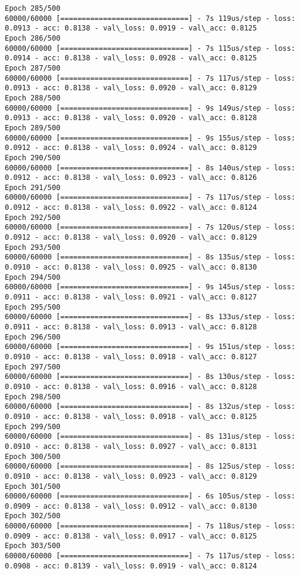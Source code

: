 \documentclass[11pt]{article}
\begin{document}
\begin{Verbatim}[commandchars=\\\{\}]
Epoch 285/500
60000/60000 [==============================] - 7s 119us/step - loss: 0.0913 - acc: 0.8138 - val\_loss: 0.0919 - val\_acc: 0.8125
Epoch 286/500
60000/60000 [==============================] - 7s 115us/step - loss: 0.0914 - acc: 0.8138 - val\_loss: 0.0928 - val\_acc: 0.8125
Epoch 287/500
60000/60000 [==============================] - 7s 117us/step - loss: 0.0913 - acc: 0.8138 - val\_loss: 0.0920 - val\_acc: 0.8129
Epoch 288/500
60000/60000 [==============================] - 9s 149us/step - loss: 0.0913 - acc: 0.8138 - val\_loss: 0.0920 - val\_acc: 0.8128
Epoch 289/500
60000/60000 [==============================] - 9s 155us/step - loss: 0.0912 - acc: 0.8138 - val\_loss: 0.0924 - val\_acc: 0.8129
Epoch 290/500
60000/60000 [==============================] - 8s 140us/step - loss: 0.0912 - acc: 0.8138 - val\_loss: 0.0923 - val\_acc: 0.8126
Epoch 291/500
60000/60000 [==============================] - 7s 117us/step - loss: 0.0912 - acc: 0.8138 - val\_loss: 0.0922 - val\_acc: 0.8124
Epoch 292/500
60000/60000 [==============================] - 7s 120us/step - loss: 0.0912 - acc: 0.8138 - val\_loss: 0.0920 - val\_acc: 0.8129
Epoch 293/500
60000/60000 [==============================] - 8s 135us/step - loss: 0.0910 - acc: 0.8138 - val\_loss: 0.0925 - val\_acc: 0.8130
Epoch 294/500
60000/60000 [==============================] - 9s 145us/step - loss: 0.0911 - acc: 0.8138 - val\_loss: 0.0921 - val\_acc: 0.8127
Epoch 295/500
60000/60000 [==============================] - 8s 133us/step - loss: 0.0911 - acc: 0.8138 - val\_loss: 0.0913 - val\_acc: 0.8128
Epoch 296/500
60000/60000 [==============================] - 9s 151us/step - loss: 0.0910 - acc: 0.8138 - val\_loss: 0.0918 - val\_acc: 0.8127
Epoch 297/500
60000/60000 [==============================] - 8s 130us/step - loss: 0.0910 - acc: 0.8138 - val\_loss: 0.0916 - val\_acc: 0.8128
Epoch 298/500
60000/60000 [==============================] - 8s 132us/step - loss: 0.0910 - acc: 0.8138 - val\_loss: 0.0918 - val\_acc: 0.8125
Epoch 299/500
60000/60000 [==============================] - 8s 131us/step - loss: 0.0910 - acc: 0.8138 - val\_loss: 0.0927 - val\_acc: 0.8131
Epoch 300/500
60000/60000 [==============================] - 8s 125us/step - loss: 0.0910 - acc: 0.8138 - val\_loss: 0.0923 - val\_acc: 0.8129
Epoch 301/500
60000/60000 [==============================] - 6s 105us/step - loss: 0.0909 - acc: 0.8138 - val\_loss: 0.0912 - val\_acc: 0.8130
Epoch 302/500
60000/60000 [==============================] - 7s 118us/step - loss: 0.0909 - acc: 0.8138 - val\_loss: 0.0917 - val\_acc: 0.8125
Epoch 303/500
60000/60000 [==============================] - 7s 117us/step - loss: 0.0908 - acc: 0.8139 - val\_loss: 0.0919 - val\_acc: 0.8124

\end{Verbatim}
\end{document}
